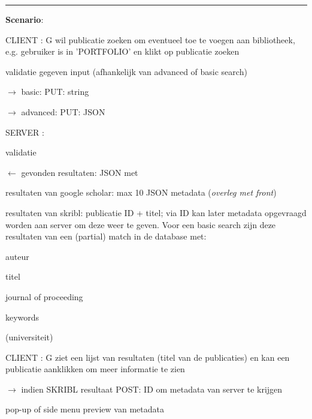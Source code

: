 \documentclass{article}
\begin{document}
\hrule
\vspace{2 mm}
\noindent \textbf{Scenario}:
\begin{description}
\item CLIENT : G wil publicatie zoeken om eventueel toe te voegen aan bibliotheek, e.g. gebruiker is in 'PORTFOLIO' en klikt op publicatie zoeken  
	\begin{description}
	\item \checkmark validatie gegeven input (afhankelijk van advanced of basic search)
	\item $\rightarrow$ basic: PUT: string  
	\item $\rightarrow$ advanced: PUT: JSON  
	\end{description}
	
\item SERVER : 
	\begin{description}
	\item \checkmark validatie
	\item $\leftarrow$ gevonden resultaten: JSON met
		\begin{description}
		\item resultaten van google scholar: max 10 JSON metadata (\emph{overleg met front})
		\item resultaten van skribl: publicatie ID + titel; via ID kan later metadata opgevraagd worden aan server om deze weer te geven. Voor een basic search zijn deze resultaten van een (partial) match in de database met:
			\begin{description}
			\item auteur
			\item titel
			\item journal of proceeding
			\item keywords
			\item (universiteit)
			\end{description}
		\end{description}
	\end{description}
	
\item CLIENT :  G ziet een lijst van resultaten (titel van de publicaties) en kan een publicatie aanklikken om meer informatie te zien 
	\begin{description}
	\item $\rightarrow$ indien SKRIBL resultaat POST: ID om metadata van server te krijgen  
	\item pop-up of side menu preview van metadata 
	\end{description}
	

\end{description}
\end{document}
